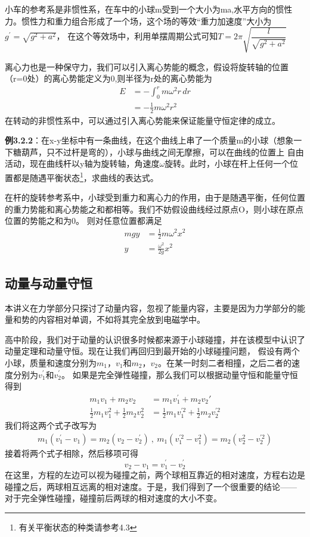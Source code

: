 \documentclass{article}
\begin{document}
    小车的参考系是非惯性系，在车中的小球m受到一个大小为ma,水平方向的惯性力。惯性力和重力组合形成了一个场，这个场的等效“重力加速度”大小为\(g^\prime = \sqrt{g^2+a^2}\)，
    在这个等效场中，利用单摆周期公式可知\(T = 2\pi\sqrt{\dfrac{l}{\sqrt{g^2+a^2}}}\)

    离心力也是一种保守力，我们可以引入离心势能的概念，假设将旋转轴的位置（r=0处）的离心势能定义为0,则半径为r处的离心势能为
    \begin{align*}
        E &= -\int_0^r m\omega^2r \, dr  \\
          &= -\frac{1}{2}m\omega^2r^2
    \end{align*}
    在转动的非惯性系中，可以通过引入离心势能来保证能量守恒定律的成立。

    \textbf{例3.2.2}：在x-y坐标中有一条曲线，在这个曲线上串了一个质量m的小球（想象一下糖葫芦，只不过杆是弯的），小球与曲线之间无摩擦，可以在曲线的位置上
    自由活动，现在曲线杆以y轴为旋转轴，角速度\(\omega\)旋转。此时，小球在杆上任何一个位置都是随遇平衡状态\footnote{有关平衡状态的种类请参考4.3}，求曲线的表达式。

    在杆的旋转参考系中，小球受到重力和离心力的作用，由于是随遇平衡，任何位置的重力势能和离心势能之和都相等。我们不妨假设曲线经过原点O，则小球在原点位置的势能之和为0。
    则对任意位置都满足
    \begin{align*}
        mgy &= \frac{1}{2} m\omega^2 x^2 \\
        y &= \frac{\omega^2}{2g}x^2
    \end{align*}

    \subsection{动量与动量守恒}
    本讲义在力学部分只探讨了动量内容，忽视了能量内容，主要是因为力学部分的能量和势的内容相对单调，不如将其完全放到电磁学中。

    高中阶段，我们对于动量的认识很多时候都来源于小球碰撞，并在该模型中认识了动量定理和动量守恒。现在让我们再回归到最开始的小球碰撞问题，
    假设有两个小球，质量和速度分别为\(m_1\)，\(v_1\)和\(m_2\)，\(v_2\)。在某一时刻二者相撞，之后二者的速度分别为\(v_1^\prime\)和\(v_2^\prime\)。
    如果是完全弹性碰撞，那么我们可以根据动量守恒和能量守恒得到
    \begin{align*}
        m_1 v_1 + m_2 v_2 &= m_1 v_1^\prime + m_2 v_2\prime \\
        \frac{1}{2}m_1 v_1^2 + \frac{1}{2} m_2 v_2^2 &= \frac{1}{2} m_1 v_1^{\prime 2} + \frac{1}{2} m_2 v_2^{\prime 2}
    \end{align*}
    我们将这两个式子改写为
    \begin{align*}
        m_1(v_1^\prime - v_1) = m_2(v_2 - v_2^\prime) \ , \  m_1(v_1^{\prime 2} - v_1^2) = m_2(v_2^2 - v_2^{\prime 2})
    \end{align*}
    接着将两个式子相除，然后移项可得
    \begin{equation*}
        v_2 - v_1 = v_1^\prime - v_2^\prime
    \end{equation*}
    在这里，方程的左边可以视为碰撞之前，两个球相互靠近的相对速度，方程右边是碰撞之后，两球相互远离的相对速度。于是，我们得到了一个很重要的结论——
    对于完全弹性碰撞，碰撞前后两球的相对速度的大小不变。
\end{document}

